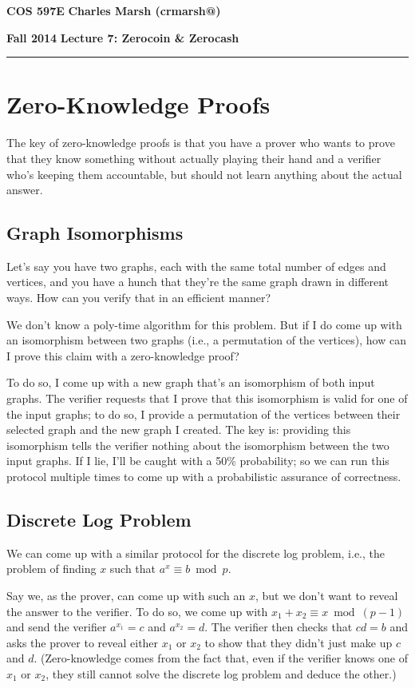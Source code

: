 \documentclass[12pt]{article}
\makeatletter
\newcommand{\myheader}[4]
{\vspace*{-0.5in}
\noindent
{#1} \hfill {#3}

\noindent
{#2} \hfill {#4}

\noindent
\rule[8pt]{\textwidth}{1pt}

\vspace{1ex} 
}  %
\newcommand{\myalgsheader}[0]
{\myheader
{ {\bf{COS 597E}} }
{ {\bf{Fall 2014}} }
{ {\bf{Charles Marsh (crmarsh@)}} }
{ {\bf{Lecture 7: Zerocoin \& Zerocash}} }
}
\makeatother
\begin{document}
\myalgsheader

\pagestyle{plain}

\section*{Zero-Knowledge Proofs}

The key of zero-knowledge proofs is that you have a prover who wants to prove that they know something without actually playing their hand and a verifier who's keeping them accountable, but should not learn anything about the actual answer.

\subsection*{Graph Isomorphisms}

Let's say you have two graphs, each with the same total number of edges and vertices, and you have a hunch that they're the same graph drawn in different ways. How can you verify that in an efficient manner?

We don't know a poly-time algorithm for this problem. But if I do come up with an isomorphism between two graphs (i.e., a permutation of the vertices), how can I prove this claim with a zero-knowledge proof?

To do so, I come up with a new graph that's an isomorphism of both input graphs. The verifier requests that I prove that this isomorphism is valid for one of the input graphs; to do so, I provide a permutation of the vertices between their selected graph and the new graph I created. The key is: providing this isomorphism tells the verifier nothing about the isomorphism between the two input graphs. If I lie, I'll be caught with a 50\% probability; so we can run this protocol multiple times to come up with a probabilistic assurance of correctness.

\subsection*{Discrete Log Problem}

We can come up with a similar protocol for the discrete log problem, i.e., the problem of finding $x$ such that $a^x \equiv b \bmod{p}$.

Say we, as the prover, can come up with such an $x$, but we don't want to reveal the answer to the verifier. To do so, we come up with $x_1 + x_2 \equiv x \bmod{(p-1)}$ and send the verifier $a^{x_1} = c$ and $a^{x_2} = d$. The verifier then checks that $cd = b$ and asks the prover to reveal either $x_1$ or $x_2$ to show that they didn't just make up $c$ and $d$. (Zero-knowledge comes from the fact that, even if the verifier knows one of $x_1$ or $x_2$, they still cannot solve the discrete log problem and deduce the other.)
\end{document}
